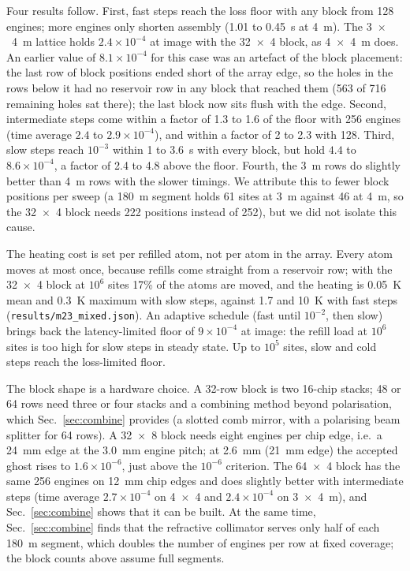 Four results follow. First, fast steps reach the loss floor with any block from 128 engines; more engines only shorten assembly (1.01 to 0.45~s at 4~\textmu m). The 3~$\times$~4~\textmu m lattice holds $2.4\times10^{-4}$ at image with the 32~$\times$~4 block, as 4~$\times$~4~\textmu m does. An earlier value of $8.1\times10^{-4}$ for this case was an artefact of the block placement: the last row of block positions ended short of the array edge, so the holes in the rows below it had no reservoir row in any block that reached them (563 of 716 remaining holes sat there); the last block now sits flush with the edge. Second, intermediate steps come within a factor of 1.3 to 1.6 of the floor with 256 engines (time average $2.4$ to $2.9\times10^{-4}$), and within a factor of 2 to 2.3 with 128. Third, slow steps reach $10^{-3}$ within 1 to 3.6~s with every block, but hold $4.4$ to $8.6\times10^{-4}$, a factor of 2.4 to 4.8 above the floor. Fourth, the 3~\textmu m rows do slightly better than 4~\textmu m rows with the slower timings. We attribute this to fewer block positions per sweep (a 180~\textmu m segment holds 61 sites at 3~\textmu m against 46 at 4~\textmu m, so the 32~$\times$~4 block needs 222 positions instead of 252), but we did not isolate this cause.

The heating cost is set per refilled atom, not per atom in the array. Every atom moves at most once, because refills come straight from a reservoir row; with the 32~$\times$~4 block at $10^6$ sites 17\% of the atoms are moved, and the heating is 0.05~\textmu K mean and 0.3~\textmu K maximum with slow steps, against 1.7 and 10~\textmu K with fast steps (\texttt{results/\allowbreak m23\_mixed.json}). An adaptive schedule (fast until $10^{-2}$, then slow) brings back the latency-limited floor of $9\times10^{-4}$ at image: the refill load at $10^6$ sites is too high for slow steps in steady state. Up to $10^5$ sites, slow and cold steps reach the loss-limited floor.

The block shape is a hardware choice. A 32-row block is two 16-chip stacks; 48 or 64 rows need three or four stacks and a combining method beyond polarisation, which Sec.~\ref{sec:combine} provides (a slotted comb mirror, with a polarising beam splitter for 64 rows). A 32~$\times$~8 block needs eight engines per chip edge, i.e.\ a 24~mm edge at the 3.0~mm engine pitch; at 2.6~mm (21~mm edge) the accepted ghost rises to $1.6\times10^{-6}$, just above the $10^{-6}$ criterion. The 64~$\times$~4 block has the same 256 engines on 12~mm chip edges and does slightly better with intermediate steps (time average $2.7\times10^{-4}$ on 4~$\times$~4 and $2.4\times10^{-4}$ on 3~$\times$~4~\textmu m), and Sec.~\ref{sec:combine} shows that it can be built. At the same time, Sec.~\ref{sec:combine} finds that the refractive collimator serves only half of each 180~\textmu m segment, which doubles the number of engines per row at fixed coverage; the block counts above assume full segments.

